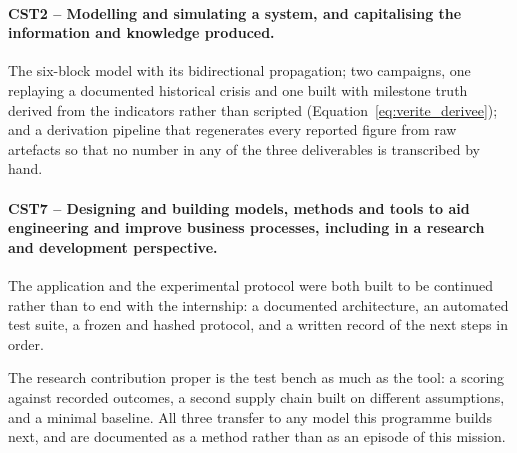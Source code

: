 \paragraph{CST2 -- Modelling and simulating a system, and capitalising the information and
knowledge produced.}
The six-block model with its bidirectional propagation; two campaigns, one replaying a
documented historical crisis and one built with milestone truth derived from the indicators
rather than scripted (Equation~\ref{eq:verite_derivee}); and a derivation pipeline that
regenerates every reported figure from raw artefacts so that no number in any of the three
deliverables is transcribed by hand.

\enlargethispage{3\baselineskip}

\paragraph{CST7 -- Designing and building models, methods and tools to aid engineering and
improve business processes, including in a research and development perspective.}
The application and the experimental protocol were both built to be continued rather than to
end with the internship: a documented architecture, an automated test suite, a frozen and
hashed protocol, and a written record of the next steps in order.

The research contribution proper is the test bench as much as the tool: a scoring against
recorded outcomes, a second supply chain built on different assumptions, and a minimal
baseline. All three transfer to any model this programme builds next, and are documented as a
method rather than as an episode of this mission.
